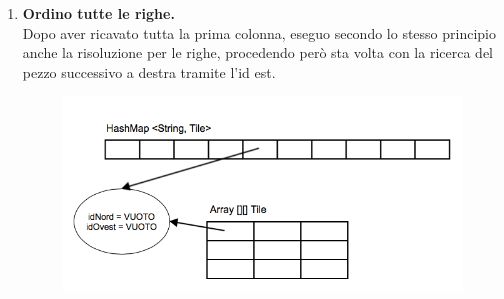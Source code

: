 \begin{enumerate}
		\item \textbf{Ordino tutte le righe.} \\
Dopo aver ricavato tutta la prima colonna, eseguo secondo lo stesso principio anche la risoluzione per le righe, procedendo però sta volta con la ricerca del pezzo successivo a destra tramite l'id est.
		\begin{figure}[htbp]
			\centering
			\includegraphics[width=15cm]{img/algpuzzle_step1.png}
		\end{figure}

	\end{enumerate}


